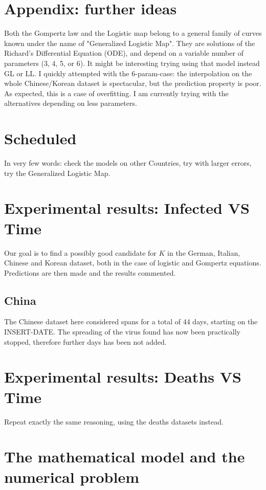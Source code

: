 \documentclass[6pt]{article}
\begin{document}
\section {Appendix: further ideas}
Both the Gompertz law and the Logistic map belong to a general family of curves known under the name of "Generalized Logistic Map". They are solutions
of the Richard's Differential Equation (ODE), and depend on a variable number of parameters (3, 4, 5, or 6).
It might be interesting trying using that model instead GL or LL. I quickly attempted with the 6-param-case: the interpolation on the whole 
Chinese/Korean dataset is spectacular, but the prediction property is poor.
As expected, this is a case of overfitting. I am currently trying with the alternatives depending on less parameters.

\section{Scheduled}
In very few words: check the models on other Countries, try with larger errors, try the Generalized Logistic Map.

\section {Experimental results: Infected VS Time}
Our goal is to find a possibly good candidate for $K$ in the German, Italian, Chinese and Korean dataset, both in the case of logistic and Gompertz equations.
Predictions are then made and the results commented.

\subsection {China}
The Chinese dataset here considered spans for a total of 44 days, starting
on the INSERT-DATE. The spreading of the virus found has now been practically
stopped, therefore further days has been not added. 

\section {Experimental results: Deaths VS Time}
Repeat exactly the same reasoning, using the deaths datasets instead.

\section{The mathematical model and the numerical problem}
\end{document}
